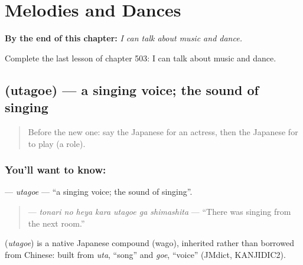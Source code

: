 
\chapter{Melodies and Dances}
\label{ch:ja-melodies-and-dances}

\begin{chapteropening}
\textbf{By the end of this chapter:} \emph{I can talk about music and dance.}

Complete the last lesson of chapter 503: I can talk about music and dance.
\end{chapteropening}

\section[\texorpdfstring{\ja{うたごえ} (utagoe)}{うたごえ (utagoe)}]{ (utagoe) — a singing voice; the sound of singing}

\label{lesson:JA-C503-utagoe}



\begin{quote}
Before the new one: say the Japanese for an actress, then the Japanese for to play (a role).
\end{quote}

\subsection*{You'll want to know: }
\textbf{} — \emph{utagoe} — \textquotedblleft{}a singing voice; the sound of singing\textquotedblright{}.

\begin{quote}
\textbf{   } — \emph{tonari no heya kara utagoe ga shimashita} — \textquotedblleft{}There was singing from the next room.\textquotedblright{}
\end{quote}

\begin{cousinweb}
\textbf{} (\emph{utagoe}) is a native Japanese compound (wago), inherited rather than borrowed from Chinese: built from \emph{uta}, \textquotedblleft{}song\textquotedblright{} and \emph{goe}, \textquotedblleft{}voice\textquotedblright{} (JMdict, KANJIDIC2).
\end{cousinweb}

